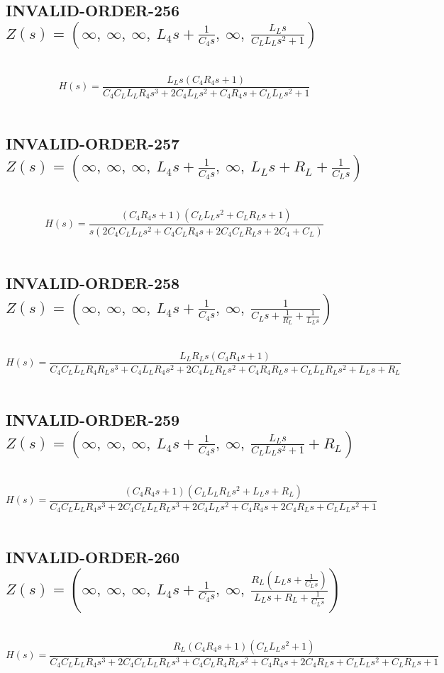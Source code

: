\documentclass{article}
\begin{document}
\subsection{INVALID-ORDER-256 $Z(s) = \left( \infty, \  \infty, \  \infty, \  L_{4} s + \frac{1}{C_{4} s}, \  \infty, \  \frac{L_{L} s}{C_{L} L_{L} s^{2} + 1}\right)$ } \ 
\textbf{\[H(s) = \frac{L_{L} s \left(C_{4} R_{4} s + 1\right)}{C_{4} C_{L} L_{L} R_{4} s^{3} + 2 C_{4} L_{L} s^{2} + C_{4} R_{4} s + C_{L} L_{L} s^{2} + 1}\] } \ 
\subsection{INVALID-ORDER-257 $Z(s) = \left( \infty, \  \infty, \  \infty, \  L_{4} s + \frac{1}{C_{4} s}, \  \infty, \  L_{L} s + R_{L} + \frac{1}{C_{L} s}\right)$ } \ 
\textbf{\[H(s) = \frac{\left(C_{4} R_{4} s + 1\right) \left(C_{L} L_{L} s^{2} + C_{L} R_{L} s + 1\right)}{s \left(2 C_{4} C_{L} L_{L} s^{2} + C_{4} C_{L} R_{4} s + 2 C_{4} C_{L} R_{L} s + 2 C_{4} + C_{L}\right)}\] } \ 
\subsection{INVALID-ORDER-258 $Z(s) = \left( \infty, \  \infty, \  \infty, \  L_{4} s + \frac{1}{C_{4} s}, \  \infty, \  \frac{1}{C_{L} s + \frac{1}{R_{L}} + \frac{1}{L_{L} s}}\right)$ } \ 
\textbf{\[H(s) = \frac{L_{L} R_{L} s \left(C_{4} R_{4} s + 1\right)}{C_{4} C_{L} L_{L} R_{4} R_{L} s^{3} + C_{4} L_{L} R_{4} s^{2} + 2 C_{4} L_{L} R_{L} s^{2} + C_{4} R_{4} R_{L} s + C_{L} L_{L} R_{L} s^{2} + L_{L} s + R_{L}}\] } \ 
\subsection{INVALID-ORDER-259 $Z(s) = \left( \infty, \  \infty, \  \infty, \  L_{4} s + \frac{1}{C_{4} s}, \  \infty, \  \frac{L_{L} s}{C_{L} L_{L} s^{2} + 1} + R_{L}\right)$ } \ 
\textbf{\[H(s) = \frac{\left(C_{4} R_{4} s + 1\right) \left(C_{L} L_{L} R_{L} s^{2} + L_{L} s + R_{L}\right)}{C_{4} C_{L} L_{L} R_{4} s^{3} + 2 C_{4} C_{L} L_{L} R_{L} s^{3} + 2 C_{4} L_{L} s^{2} + C_{4} R_{4} s + 2 C_{4} R_{L} s + C_{L} L_{L} s^{2} + 1}\] } \ 
\subsection{INVALID-ORDER-260 $Z(s) = \left( \infty, \  \infty, \  \infty, \  L_{4} s + \frac{1}{C_{4} s}, \  \infty, \  \frac{R_{L} \left(L_{L} s + \frac{1}{C_{L} s}\right)}{L_{L} s + R_{L} + \frac{1}{C_{L} s}}\right)$ } \ 
\textbf{\[H(s) = \frac{R_{L} \left(C_{4} R_{4} s + 1\right) \left(C_{L} L_{L} s^{2} + 1\right)}{C_{4} C_{L} L_{L} R_{4} s^{3} + 2 C_{4} C_{L} L_{L} R_{L} s^{3} + C_{4} C_{L} R_{4} R_{L} s^{2} + C_{4} R_{4} s + 2 C_{4} R_{L} s + C_{L} L_{L} s^{2} + C_{L} R_{L} s + 1}\] } \ 
\end{document}
